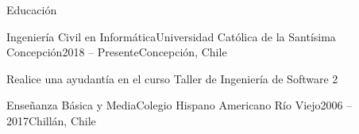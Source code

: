 \begin{section}{Educación}

    \begin{subsection}{Ingeniería Civil en Informática}{Universidad Católica de la Santísima Concepción}{2018 -- Presente}{Concepción, Chile}
    {
    \item{Realice una ayudantía en el curso Taller de Ingeniería de Software 2} 
    }
    \end{subsection}
    
    \begin{subsection}{Enseñanza Básica y Media}{Colegio Hispano Americano Río Viejo}{2006 -- 2017}{Chillán, Chile} 
    {}
    \end{subsection}
    
\end{section}